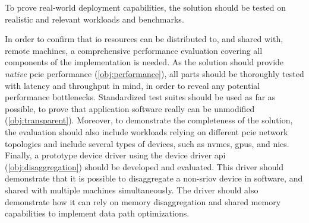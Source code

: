 \begin{objective}\label{obj:experiments}
    To prove real-world deployment capabilities, the solution should be tested on realistic and relevant workloads and benchmarks.
\end{objective}
In order to confirm that \gls{io} resources can be distributed to, and shared with, remote machines, a comprehensive performance evaluation covering all components of the implementation is needed.
%
As the solution should provide \emph{native} \gls{pcie} performance (\cref{obj:performance}), all parts should be thoroughly tested with latency and throughput in mind, in order to reveal any potential performance bottlenecks.
Standardized test suites should be used as far as possible, to prove that application software really can be unmodified (\cref{obj:transparent}).
%
Moreover, to demonstrate the completeness of the solution, the evaluation should also include workloads relying on different \gls{pcie} network topologies and include several types of devices, such as \glspl{nvme}, \glspl{gpu}, and \glspl{nic}.
%
Finally, a prototype device driver using the device driver \gls{api} (\cref{obj:disaggregation}) should be developed and evaluated. This driver should demonstrate that it is possible to \gls{disaggregate} a non-\gls{sriov} device in software, and shared with multiple machines simultaneously. 
%
The driver should also demonstrate how it can rely on memory \gls{disaggregation} and shared memory capabilities to implement data path optimizations.



